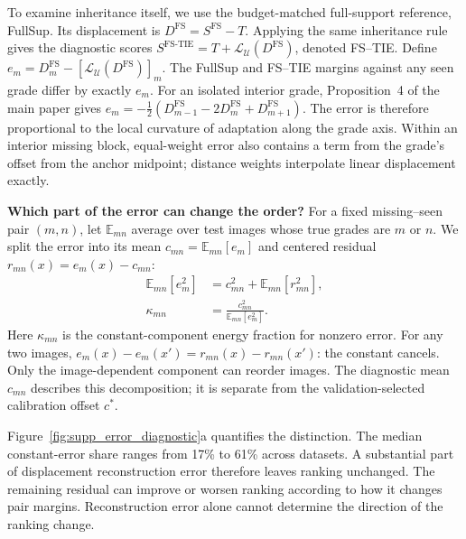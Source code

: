 To examine inheritance itself, we use the budget-matched full-support reference, FullSup.
Its displacement is $D^{\mathrm{FS}}=S^{\mathrm{FS}}-T$.
Applying the same inheritance rule gives the diagnostic scores $S^{\mathrm{FS\text{-}TIE}}=T+\mathcal L_{\mathcal U}(D^{\mathrm{FS}})$, denoted FS--TIE.
Define $e_m=D_m^{\mathrm{FS}}-[\mathcal L_{\mathcal U}(D^{\mathrm{FS}})]_m$.
The FullSup and FS--TIE margins against any seen grade differ by exactly $e_m$.
For an isolated interior grade, Proposition~4 of the main paper gives
$e_m=-\tfrac12(D_{m-1}^{\mathrm{FS}}-2D_m^{\mathrm{FS}}+D_{m+1}^{\mathrm{FS}})$.
The error is therefore proportional to the local curvature of adaptation along the grade axis.
Within an interior missing block, equal-weight error also contains a term from the grade's offset from the anchor midpoint; distance weights interpolate linear displacement exactly.

\noindent\textbf{Which part of the error can change the order?}
For a fixed missing--seen pair $(m,n)$, let $\mathbb E_{mn}$ average over test images whose true grades are $m$ or $n$.
We split the error into its mean $c_{mn}=\mathbb E_{mn}[e_m]$ and centered residual $r_{mn}(x)=e_m(x)-c_{mn}$:
\begin{equation}
\begin{aligned}
\mathbb E_{mn}[e_m^2]
&=c_{mn}^2+\mathbb E_{mn}[r_{mn}^2],\\
\kappa_{mn}
&=\frac{c_{mn}^2}{\mathbb E_{mn}[e_m^2]}.
\end{aligned}
\label{eq:supp_error_components}
\end{equation}
Here $\kappa_{mn}$ is the constant-component energy fraction for nonzero error.
For any two images, $e_m(x)-e_m(x')=r_{mn}(x)-r_{mn}(x')$: the constant cancels.
Only the image-dependent component can reorder images.
The diagnostic mean $c_{mn}$ describes this decomposition; it is separate from the validation-selected calibration offset $c^*$.

Figure~\ref{fig:supp_error_diagnostic}a quantifies the distinction.
The median constant-error share ranges from 17\% to 61\% across datasets.
A substantial part of displacement reconstruction error therefore leaves ranking unchanged.
The remaining residual can improve or worsen ranking according to how it changes pair margins.
Reconstruction error alone cannot determine the direction of the ranking change.

